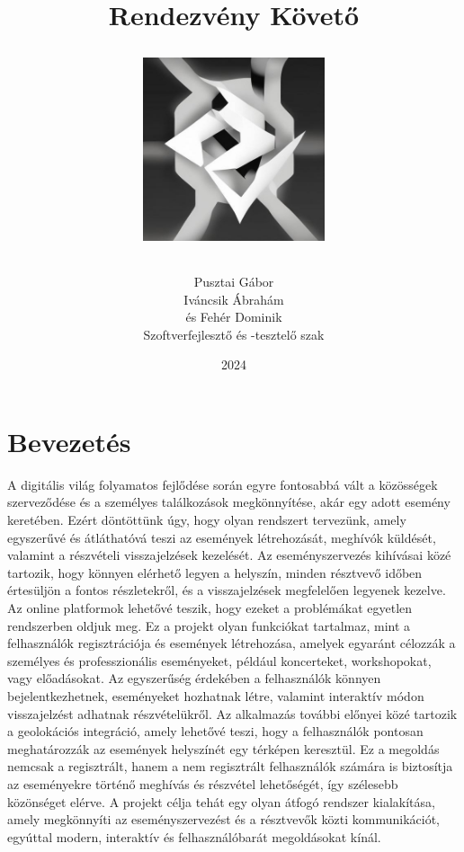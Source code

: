 \documentclass[colorlinks]{thesis-kando}
\theoremstyle{definition}
\theoremstyle{remark}
\begin{document}
\title{Rendezvény Követő\\[1em]
	\begin{center}
		\includegraphics[width=0.4\textwidth]{logo.jpg}
\end{center}}
\author{Pusztai Gábor\\ Iváncsik Ábrahám\\és Fehér Dominik\\Szoftverfejlesztő és -tesztelő szak}
\date{2024}
\maketitle

\tableofcontents

\chapter*{Bevezetés}

A digitális világ folyamatos fejlődése során egyre fontosabbá vált a közösségek szerveződése és a személyes találkozások megkönnyítése, akár egy adott esemény keretében. Ezért döntöttünk úgy, hogy olyan rendszert tervezünk, amely egyszerűvé és átláthatóvá teszi az események létrehozását, meghívók küldését, valamint a részvételi visszajelzések kezelését. Az eseményszervezés kihívásai közé tartozik, hogy könnyen elérhető legyen a helyszín, minden résztvevő időben értesüljön a fontos részletekről, és a visszajelzések megfelelően legyenek kezelve. Az online platformok lehetővé teszik, hogy ezeket a problémákat egyetlen rendszerben oldjuk meg. Ez a projekt olyan funkciókat tartalmaz, mint a felhasználók regisztrációja és események létrehozása, amelyek egyaránt célozzák a személyes és professzionális eseményeket, például koncerteket, workshopokat, vagy előadásokat. Az egyszerűség érdekében a felhasználók könnyen bejelentkezhetnek, eseményeket hozhatnak létre, valamint interaktív módon visszajelzést adhatnak részvételükről. Az alkalmazás további előnyei közé tartozik a geolokációs integráció, amely lehetővé teszi, hogy a felhasználók pontosan meghatározzák az események helyszínét egy térképen keresztül. Ez a megoldás nemcsak a regisztrált, hanem a nem regisztrált felhasználók számára is biztosítja az eseményekre történő meghívás és részvétel lehetőségét, így szélesebb közönséget elérve. A projekt célja tehát egy olyan átfogó rendszer kialakítása, amely megkönnyíti az eseményszervezést és a résztvevők közti kommunikációt, egyúttal modern, interaktív és felhasználóbarát megoldásokat kínál.
\cite{Fazekas}
\end{document}
